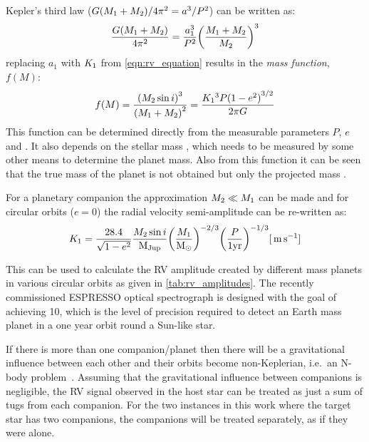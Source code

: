 Kepler's third law (\({G (\mone + \mtwo)}/{4\pi^{2}}= {a}^{3}/{P}^{2}\)) can be written as:
\begin{equation}
    \frac{G (\mone{} + \mtwo{})}{4\pi^{2}} = \frac{a_{1}^{3}}{P^{2}}{\left(\frac{\mone{} + \mtwo}{\mtwo}\right)}^{3}
\end{equation}
replacing $a_{1}$ with $\kone$ from \cref{eqn:rv_equation} results in the \emph{mass function}, $f(M)$:
\begin{equation}
    f(M) = \frac{{(\mtwosini)}^{3}}{{(\mone{} + \mtwo{})}^{2}} = \frac{\kone{}^{3} P {(\oneminusetwo)}^{3/2}}{2 \pi G} \label{eqn:mass_function}
\end{equation}
This function can be determined directly from the measurable parameters $P$, $e$ and \Kone{}.
It also depends on the stellar mass \Mone{}, which needs to be measured by some other means to determine the planet mass.
Also from this function it can be seen that the true mass of the planet \Mtwo{} is not obtained but only the projected mass \Mtwosini{}.

For a planetary companion the approximation $\mtwo{} \ll \mone{}$ can be made and for circular orbits ($e=0$) the radial velocity semi-amplitude can be re-written as:
\begin{equation}
    \kone{} = \frac{28.4}{\sqrt{\oneminusetwo}} \frac{\mtwosini}{\mjup} {\left(\frac{\mone}{\modot}\right)}^{-2/3} {\left(\frac{P}{1 \si{yr}}\right)}^{-1/3}  [\mps] \label{eqn:k_relation}
\end{equation}

This can be used to calculate the {RV} amplitude created by different mass planets in various circular orbits as given in \cref{tab:rv_amplitudes}.
The recently commissioned ESPRESSO optical spectrograph is designed with the goal of achieving 10\cmps{}, which is the level of precision required to detect an Earth mass planet in a one year orbit round a Sun-like star.



If there is more than one companion/planet then there will be a gravitational influence between each other and their orbits become non-Keplerian, i.e.\ an N-body problem~\citep[e.g.][]{chenciner_three_2007}.
Assuming that the gravitational influence between companions is negligible, the {RV} signal observed in the host star can be treated as just a sum of tugs from each companion.
For the two instances in this work where the target star has two companions, the companions will be treated separately, as if they were alone.



